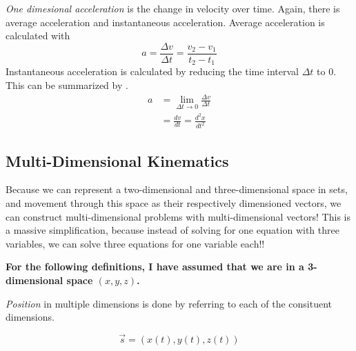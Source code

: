 \begin{definition}[Acceleration]\label{def:1-D Acceleration}
  \emph{One dimesional acceleration} is the change in velocity over time.
  Again, there is average acceleration and instantaneous acceleration.
  Average acceleration is calculated with 
  \begin{equation}\label{eq:1-D Average Acceleration}
    a = \frac{\Delta v}{\Delta t} = \frac{v_{2} - v_{1}}{t_{2} - t_{1}}
  \end{equation}
  Instantaneous acceleration is calculated by reducing the time interval $\Delta t$ to 0.
  This can be summarized by .
  \begin{equation}\label{eq:1-D Instantaneous Acceleration}
    \begin{aligned}
      a &= \lim\limits_{\Delta t \rightarrow 0} \frac{\Delta v}{\Delta t} \\
      &= \frac{dv}{dt} = \frac{d^{2}x}{dt^{2}}
    \end{aligned}
  \end{equation}
\end{definition}

\subsection{Multi-Dimensional Kinematics}\label{Multi-D Kinematics}
Because we can represent a two-dimensional and three-dimensional space in sets, and movement through this space as their respectively dimensioned vectors, we can construct multi-dimensional problems with multi-dimensional vectors!
This is a massive simplification, because instead of solving for one equation with three variables, we can solve three equations for one variable each!!

\textbf{For the following definitions, I have assumed that we are in a 3-dimensional space $(x, y, z)$.}

\begin{definition}\label{Multi-D Position}
  \emph{Position} in multiple dimensions is done by referring to each of the consituent dimensions.

  \begin{equation}\label{eq:Multi-D Position}
    \vec{s} = \left( x(t), y(t), z(t) \right)
  \end{equation}
\end{definition}

